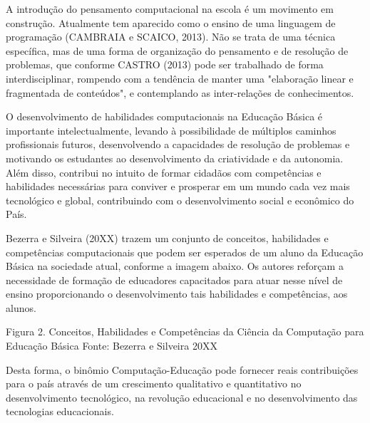     
	A introdução do pensamento computacional na escola é um  movimento em construção. Atualmente tem aparecido como o ensino de uma linguagem de programação (CAMBRAIA e SCAICO, 2013). Não se trata de uma técnica específica, mas de uma forma de organização do pensamento e de resolução de problemas, que conforme CASTRO (2013) pode ser trabalhado de forma interdisciplinar, rompendo com a tendência de manter uma "elaboração linear e fragmentada de conteúdos", e contemplando as inter-relações de conhecimentos.
    
    
	O desenvolvimento de habilidades computacionais na Educação Básica é importante intelectualmente, levando à possibilidade de múltiplos caminhos profissionais futuros, desenvolvendo a capacidades de resolução de problemas e motivando os estudantes ao desenvolvimento da criatividade e da autonomia. Além disso, contribui no intuito de formar cidadãos com competências e habilidades necessárias para conviver e prosperar em um mundo cada vez mais tecnológico e global, contribuindo com o desenvolvimento social e econômico do País.
    
    
	Bezerra e Silveira (20XX) trazem um conjunto de conceitos, habilidades e competências computacionais que podem ser esperados de um aluno da Educação Básica na sociedade atual, conforme a imagem abaixo. Os autores reforçam a necessidade de formação de educadores capacitados para atuar nesse nível de ensino proporcionando o desenvolvimento tais habilidades e competências, aos alunos.
 
 
Figura 2. Conceitos, Habilidades e Competências da Ciência da Computação para Educação Básica Fonte: Bezerra e Silveira 20XX
 
	Desta forma,  o binômio Computação-Educação pode fornecer reais contribuições para o país através de um crescimento qualitativo e quantitativo no desenvolvimento tecnológico, na revolução educacional e no desenvolvimento das tecnologias educacionais.